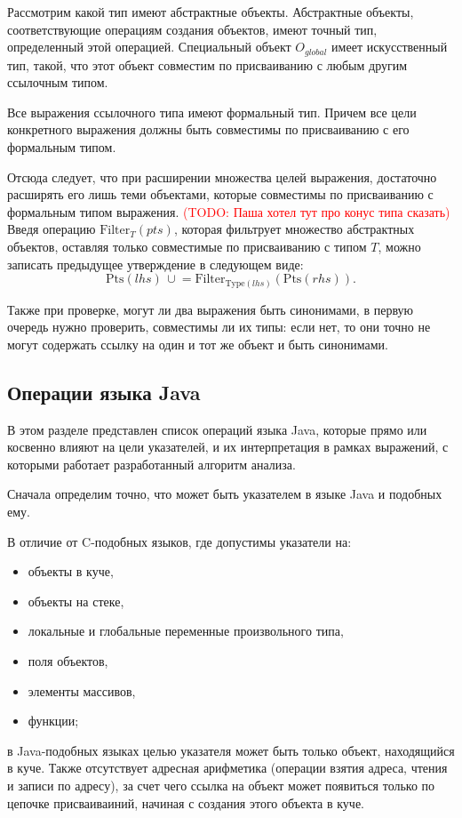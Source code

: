 \documentclass[14pt,titlepage]{extarticle}
\newcommand{\Type}[1]{\textrm{Type}(#1)}
\newcommand{\Pts}[1]{\textrm{Pts}(#1)}
\newcommand{\Filter}[2]{\textrm{Filter}_{#1}(#2)}
\newcommand{\cupe}{\,\cup\!\!=}
\newcommand{\todo}[1]{\textcolor{red}{(\eng{TODO}: #1)}}
\newcommand{\eng}[1]{{\English#1}}
\begin{document}
        Рассмотрим какой тип имеют абстрактные объекты. Абстрактные объекты,
        соответствующие операциям создания объектов, имеют точный тип,
        определенный этой операцией.
        Специальный объект $O_{global}$ имеет искусственный тип, такой, что
        этот объект совместим по присваиванию с любым другим ссылочным типом.

        Все выражения ссылочного типа имеют формальный тип. Причем все цели
        конкретного выражения должны быть совместимы по присваиванию с его
        формальным типом.

        Отсюда следует, что при расширении множества целей выражения,
        достаточно расширять его лишь теми объектами, которые совместимы по
        присваиванию с формальным типом выражения. \todo{Паша хотел тут про
        конус типа сказать}
        Введя операцию $\Filter{T}{pts}$, которая фильтрует множество
        абстрактных объектов, оставляя только совместимые по присваиванию с
        типом $T$, можно записать предыдущее утверждение в следующем виде:
        \[\Pts{lhs} \cupe \Filter{\Type{lhs}}{\Pts{rhs}}.\]

        Также при проверке, могут ли два выражения быть синонимами, в первую
        очередь нужно проверить, совместимы ли их типы: если нет, то они точно
        не могут содержать ссылку на один и тот же объект и быть синонимами.

    \subsection{Операции языка Java}
      \label{section:operations}

      В этом разделе представлен список операций языка Java, которые прямо или
      косвенно влияют на цели указателей, и их интерпретация в рамках
      выражений, с которыми работает разработанный алгоритм анализа.

      Сначала определим точно, что может быть указателем в языке Java и
      подобных ему.

      В отличие от C-подобных языков, где допустимы указатели на:
      \begin{itemize}
        \item объекты в куче,
        \item объекты на стеке,
        \item локальные и глобальные переменные произвольного типа,
        \item поля объектов,
        \item элементы массивов,
        \item функции;
      \end{itemize}
      в Java-подобных языках целью указателя может быть только объект,
      находящийся в куче. Также отсутствует адресная арифметика (операции
      взятия адреса, чтения и записи по адресу), за счет чего ссылка на объект
      может появиться только по цепочке присваиваиний, начиная с создания этого
      объекта в куче.
\end{document}

